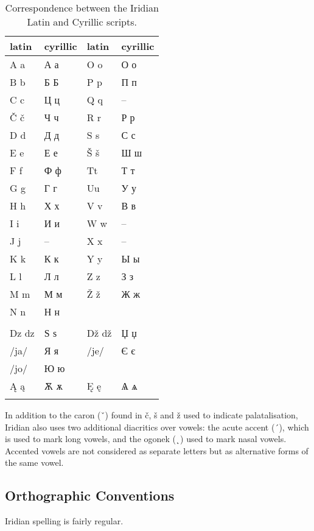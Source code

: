 \begin{table}[h]
	\footnotesize\sffamily
 	\caption{Correspondence between the Iridian Latin and Cyrillic scripts.}
	\medskip
	\begin{tabu}to 0.8 
		\toprule
		{{\sc  latin}} & {\sc cyrillic} & {{\sc  latin}} & {\sc cyrillic} \\
		\midrule\addlinespace
		A a 		& А а	& O o   & О о \\ 
		B b			& Б Б 	& P p 	& П п \\
		C c 		& Ц ц 	& Q q 	& -- \\
		Č č 		& Ч ч 	& R r 	& Р р \\
		D d 		& Д д	& S s 	& С с \\
		E e 		& Е е 	& Š š 	& Ш ш \\
		F f			& Ф ф	& Tt 	& Т т \\
		G g 		& Г г	& Uu	& У у \\
		H h			& Х х	& V v   & В в\\
		I i			& И и	& W w   & --\\
		J j			& --	& X x   & --\\
		K k			& К к	& Y y   & Ы ы\\
		L l			& Л л   & Z z   & З з\\
		M m 		& М м   & Ž ž   & Ж ж\\
		N n 		& Н н   &&\\\addlinespace
		\\\addlinespace
		Dz dz 		& Ѕ ѕ 	& Dž dž & Џ џ\\
		/ja/ 		& Я я	&/je/ & Є є\\
		/jo/		& Ю ю   & &\\
		\k{A} \k{a} & Ѫ ѫ&\k{E} \k{e}&Ѧ ѧ\\ \addlinespace
		\bottomrule
	\end{tabu}
\end{table}
 
In addition to the caron (ˇ) found in č, š and ž used to indicate palatalisation, Iridian also uses two additional diacritics over vowels: the acute accent (´), which is used to mark long vowels, and the ogonek (˛) used to mark nasal vowels. Accented vowels are not considered as separate letters but as alternative forms of the same vowel.

\subsection{Orthographic Conventions}
Iridian spelling is fairly regular.

